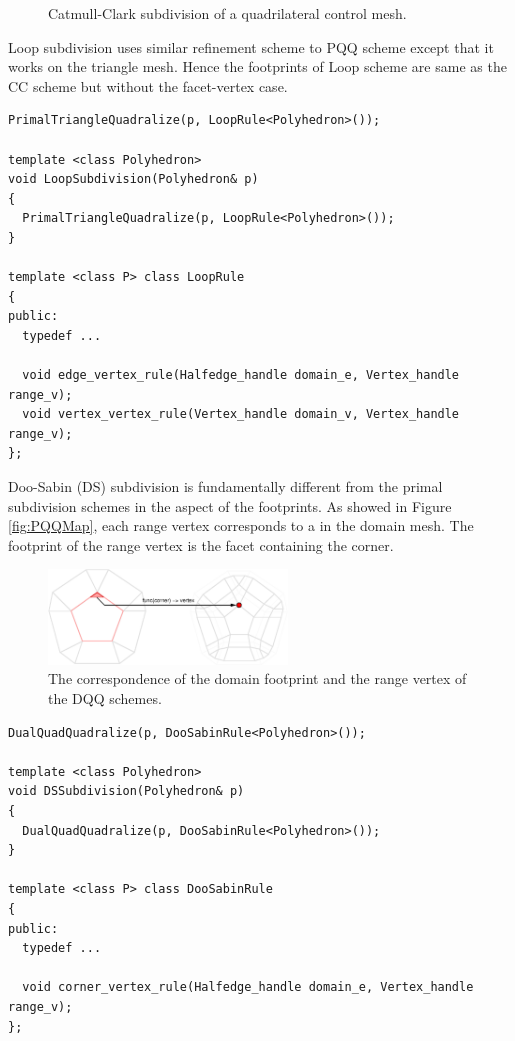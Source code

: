 
\begin{figure}[htb]
    \caption{Catmull-Clark subdivision of a quadrilateral control mesh.}  
    \label{fig:cc}
\end{figure}

Loop subdivision uses similar refinement scheme to PQQ scheme except
that it works on the triangle mesh. Hence the footprints of Loop
scheme are same as the CC scheme but without the facet-vertex case.

{\scriptsize
\begin{verbatim}
PrimalTriangleQuadralize(p, LoopRule<Polyhedron>());

template <class Polyhedron>
void LoopSubdivision(Polyhedron& p) 
{ 
  PrimalTriangleQuadralize(p, LoopRule<Polyhedron>());
}

template <class P> class LoopRule 
{
public:
  typedef ...

  void edge_vertex_rule(Halfedge_handle domain_e, Vertex_handle range_v);
  void vertex_vertex_rule(Vertex_handle domain_v, Vertex_handle range_v);
};
\end{verbatim}
}

Doo-Sabin (DS) subdivision is fundamentally different from the primal
subdivision schemes in the aspect of the footprints. As showed in
Figure \ref{fig:PQQMap}, each range vertex corresponds to a
 in the domain mesh. The footprint of the range vertex
is the facet containing the corner.

\begin{figure}
  \centering
  \includegraphics[width=2.5in]{pfigs/DQQRefMap.eps}
  \caption{The correspondence of the domain footprint and the 
           range vertex of the DQQ schemes.}
  \label{fig:DQQMap}
\end{figure}


{\scriptsize
\begin{verbatim}
DualQuadQuadralize(p, DooSabinRule<Polyhedron>());

template <class Polyhedron>
void DSSubdivision(Polyhedron& p) 
{ 
  DualQuadQuadralize(p, DooSabinRule<Polyhedron>());
}

template <class P> class DooSabinRule 
{
public:
  typedef ...

  void corner_vertex_rule(Halfedge_handle domain_e, Vertex_handle range_v);
};
\end{verbatim}
}

